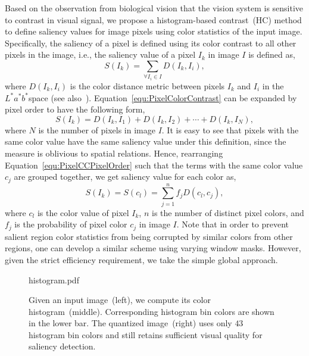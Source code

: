 \documentclass[10pt,twocolumn,letterpaper]{article}
\newcommand{\equref}[1]{Equation~\ref{#1}}
\newcommand{\Lab}{$L^*a^*b^*$}
\newcommand{\vnudge}{\vspace*{-.1in}}
\begin{document}
Based on the observation from biological vision that the vision system is sensitive to contrast in visual signal,
we propose a histogram-based contrast~(HC) method to define saliency values
for image pixels using color statistics of the input image.
%
Specifically, the saliency of a pixel is defined using its color contrast to all other pixels in the image,
i.e., the saliency value of a pixel $I_k$ in image $I$ is defined as,
\begin{equation}\label{equ:PixelColorContrast}
    S(I_k) = \sum_{\forall I_i \in I} D(I_k, I_i),
\end{equation}
where $D(I_k, I_i)$ is the color distance metric between pixels $I_k$ and $I_i$ in the
\Lab space (see also~\cite{06acmmm/ZhaiS_spatiotemporal}).
%
%
\equref{equ:PixelColorContrast} can be expanded by pixel order to have the following
form,
\begin{equation}\label{equ:PixelCCPixelOrder}
    S(I_k) = D(I_k, I_1) + D(I_k, I_2) + \cdots + D(I_k, I_N),
\end{equation}where $N$ is the number of pixels in image $I$.
%
It is easy to see that pixels with the same color value have the same saliency value
under this definition, since the measure is oblivious to spatial relations. Hence,
rearranging \equref{equ:PixelCCPixelOrder} such that the terms with the same color value
$c_j$ are grouped together, we get saliency value for each color as,
\begin{equation}\label{equ:PixelCCColorOrder}
    S(I_k) = S(c_l) = \sum_{j=1}^{n}{f_j D(c_l, c_j)},
\end{equation}
where $c_l$ is the color value of pixel $I_k$, $n$ is the number of distinct pixel colors, and
$f_j$ is the probability of pixel color $c_j$ in image $I$.
%
Note that in order to prevent salient region color statistics from being corrupted by
similar colors from other regions, one can develop a similar scheme using varying window
masks. However, given the strict efficiency requirement, we take the simple global
approach.


\begin{figure}
  	\begin{overpic}[width=\columnwidth]{histogram.pdf}
    \end{overpic}
    \caption{Given an input image~(left), we compute its color histogram~(middle).
      Corresponding histogram bin colors are shown in the lower bar.
      The quantized image~(right) uses only  $43$ histogram bin colors
      and still retains sufficient visual quality for saliency detection.
    }\label{fig:colorFre} \vnudge
\end{figure}
\end{document}
